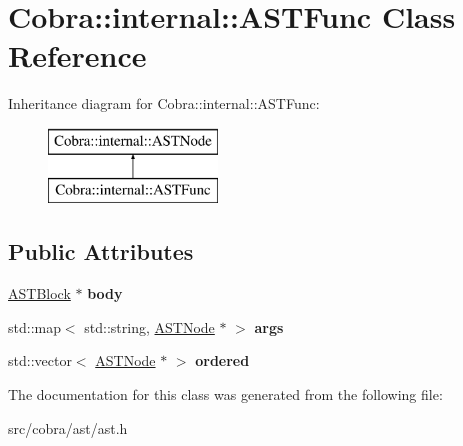 \hypertarget{class_cobra_1_1internal_1_1_a_s_t_func}{\section{Cobra\+:\+:internal\+:\+:A\+S\+T\+Func Class Reference}
\label{class_cobra_1_1internal_1_1_a_s_t_func}
}
Inheritance diagram for Cobra\+:\+:internal\+:\+:A\+S\+T\+Func\+:\begin{figure}[H]
\begin{center}
\leavevmode
\includegraphics[height=2.000000cm]{class_cobra_1_1internal_1_1_a_s_t_func}
\end{center}
\end{figure}
\subsection*{Public Attributes}
\begin{DoxyCompactItemize}
\item 
\hypertarget{class_cobra_1_1internal_1_1_a_s_t_func_a6e67ed4f5bba2a0cf2a65cdc72180730}{\hyperlink{class_cobra_1_1internal_1_1_a_s_t_block}{A\+S\+T\+Block} $\ast$ {\bfseries body}}\label{class_cobra_1_1internal_1_1_a_s_t_func_a6e67ed4f5bba2a0cf2a65cdc72180730}

\item 
\hypertarget{class_cobra_1_1internal_1_1_a_s_t_func_a21e9a01b1a5d2596bbd7292bf384d18a}{std\+::map$<$ std\+::string, \hyperlink{class_cobra_1_1internal_1_1_a_s_t_node}{A\+S\+T\+Node} $\ast$ $>$ {\bfseries args}}\label{class_cobra_1_1internal_1_1_a_s_t_func_a21e9a01b1a5d2596bbd7292bf384d18a}

\item 
\hypertarget{class_cobra_1_1internal_1_1_a_s_t_func_a71cd104c6887f10e539264b9a529dd4e}{std\+::vector$<$ \hyperlink{class_cobra_1_1internal_1_1_a_s_t_node}{A\+S\+T\+Node} $\ast$ $>$ {\bfseries ordered}}\label{class_cobra_1_1internal_1_1_a_s_t_func_a71cd104c6887f10e539264b9a529dd4e}

\end{DoxyCompactItemize}


The documentation for this class was generated from the following file\+:\begin{DoxyCompactItemize}
\item 
src/cobra/ast/ast.\+h\end{DoxyCompactItemize}
